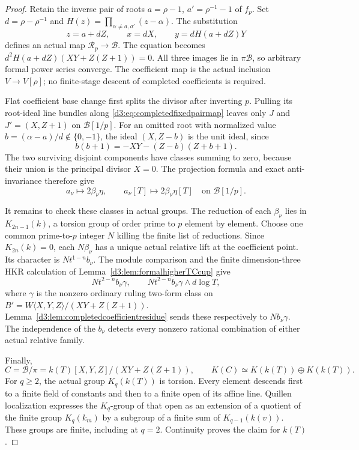 \documentclass[11pt,a4paper]{amsart}
\numberwithin{equation}{section}
\theoremstyle{definition}
\theoremstyle{remark}
\begin{document}
\begin{proof}
Retain the inverse pair of roots
$a=\rho-1$, $a'=\rho^{-1}-1$ of $f_p$.
Set $d=\rho-\rho^{-1}$ and
$H(z)=\prod_{\alpha\ne a,a'}(z-\alpha)$.
The substitution
\begin{equation}\label{d3:eq:completedfixedpairmap}
 z=a+dZ,\qquad x=dX,\qquad y=dH(a+dZ)Y
\end{equation}
defines an actual map $\mathcal R_p\to\mathcal B$.
The equation becomes $d^2H(a+dZ)(XY+Z(Z+1))=0$.
All three images lie in $\pi\mathcal B$, so arbitrary formal
power series converge. The coefficient map is the actual
inclusion $V\to V[\rho]$; no finite-stage descent of completed
coefficients is required.

Flat coefficient base change first splits the divisor after
inverting $p$. Pulling its root-ideal line bundles along
\eqref{d3:eq:completedfixedpairmap} leaves only $J$ and
$J'=(X,Z+1)$ on $\mathcal B[1/p]$.
For an omitted root with normalized value
$b=(\alpha-a)/d\notin\{0,-1\}$, the ideal
$(X,Z-b)$ is the unit ideal, since
\[
 b(b+1)=-XY-(Z-b)(Z+b+1).
\]
The two surviving disjoint components have classes summing
to zero, because their union is the principal divisor $X=0$.
The projection formula and exact anti-invariance therefore give
\begin{equation}\label{d3:eq:completedfixedimages}
 a_\nu\longmapsto2\beta_\nu\eta,\qquad
 a_\nu[T]\longmapsto2\beta_\nu\eta[T]
 \quad\text{on }\mathcal B[1/p].
\end{equation}

It remains to check these classes in actual groups.
The reduction of each $\beta_\nu$ lies in
$K_{2n-1}(k)$, a torsion group of order prime to $p$
element by element. Choose one common prime-to-$p$ integer
$N$ killing the finite list of reductions.
Since $K_{2n}(k)=0$, each $N\beta_\nu$ has a unique actual
relative lift at the coefficient point.
Its character is $Nt^{1-n}b_\nu$.
The module comparison and the finite dimension-three HKR
calculation of Lemma~\ref{d3:lem:formalhigherTCcup} give
\[
 Nt^{2-n}b_\nu\gamma,\qquad
 Nt^{2-n}b_\nu\gamma\wedge d\log T,
\]
where $\gamma$ is the nonzero ordinary ruling two-form class
on $B'=W\langle X,Y,Z\rangle/(XY+Z(Z+1))$.
Lemma~\ref{d3:lem:completedcoefficientresidue} sends these
respectively to $Nb_\nu\gamma$.
The independence of the $b_\nu$ detects every nonzero
rational combination of either actual relative family.

Finally,
\[
 C=\mathcal B/\pi
   =k(T)[X,Y,Z]/(XY+Z(Z+1)),\qquad
 K(C)\simeq K(k(T))\oplus K(k(T)).
\]
For $q\geq2$, the actual group $K_q(k(T))$ is torsion.
Every element descends first to a finite field of constants
and then to a finite open of its affine line.
Quillen localization expresses the $K_q$-group of that open
as an extension of a quotient of the finite group $K_q(k_m)$
by a subgroup of a finite sum of $K_{q-1}(k(v))$.
These groups are finite, including at $q=2$.
Continuity proves the claim for $k(T)$.


\end{proof}
\end{document}

